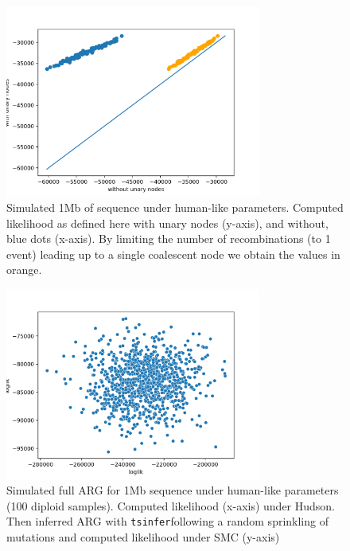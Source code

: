 \documentclass{article}
\newcommand{\tsinfer}[0]{\texttt{tsinfer}}
\begin{document}
\begin{figure}[!ht]
\centering
\includegraphics[width=0.75\textwidth]{figures/supplementary-figs/without_unary.png}
\caption{Simulated 1Mb of sequence under human-like parameters. Computed likelihood as defined here with unary nodes (y-axis), and without, blue dots (x-axis). By limiting the number of recombinations (to 1 event) leading up to a single coalescent node we obtain the values in orange.}
 \label{sup:fig:rec-correction}
\end{figure}

\begin{figure}[!ht]
\centering
\includegraphics[width=0.75\textwidth]{figures/supplementary-figs/hudson_liks_vs_tsinfer_smc.png}
\caption{Simulated full ARG for 1Mb sequence under human-like parameters (100 diploid samples). Computed likelihood (x-axis) under Hudson. Then inferred ARG with \tsinfer following a random sprinkling of mutations and computed likelihood under SMC (y-axis)}
 \label{sup:fig:hudson-smc}
\end{figure}
\end{document}
